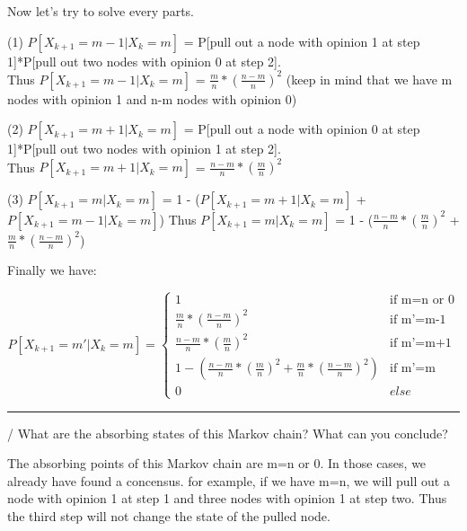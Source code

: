 \documentclass[11pt]{article}
\begin{document}
\vspace{5mm}

\noindent Now let's try to solve every parts.

(1) $P[X_{k+1} = m-1|X_{k} = m]$ = P[pull out a node with opinion 1 at step 1]*P[pull out two nodes with opinion 0 at step 2]. \\
Thus $P[X_{k+1} = m-1|X_{k} = m]$ = $\frac{m}{n}*(\frac{n-m}{n})^{2}$ (keep in mind that we have m nodes with opinion 1 and n-m nodes with opinion 0)

(2) $P[X_{k+1} = m+1|X_{k} = m]$ = P[pull out a node with opinion 0 at step 1]*P[pull out two nodes with opinion 1 at step 2]. \\
Thus $P[X_{k+1} = m+1|X_{k} = m]$ = $\frac{n-m}{n}*(\frac{m}{n})^{2}$

(3) $P[X_{k+1} = m|X_{k} = m]$ = 1 - ($P[X_{k+1} = m+1|X_{k} = m]$ + $P[X_{k+1} = m-1|X_{k} = m]$)
Thus $P[X_{k+1} = m|X_{k} = m]$ = 1 - ($\frac{n-m}{n}*(\frac{m}{n})^{2}$ + $\frac{m}{n}*(\frac{n-m}{n})^{2}$)

\vspace{5mm}

\noindent Finally we have: 

\begin{equation}
    P[X_{k+1} = m'|X_{k} = m]=
    \begin{cases}
        1 & \text{if m=n or 0}\\
        \frac{m}{n}*(\frac{n-m}{n})^{2} & \text{if m'=m-1}\\
        \frac{n-m}{n}*(\frac{m}{n})^{2} & \text{if m'=m+1}\\
        1 - (\frac{n-m}{n}*(\frac{m}{n})^{2} + \frac{m}{n}*(\frac{n-m}{n})^{2}) & \text{if m'=m}\\
        0 & else

    \end{cases}
\end{equation}


\begin{center}
    \noindent\rule{8cm}{0.4pt} 
\end{center}

\vspace{5mm}

/ What are the absorbing states of this Markov chain? What can you conclude?

\vspace{5mm}

\noindent The absorbing points of this Markov chain are m=n or 0. In those cases, we already have found a concensus. for example, if we have m=n, we will pull out a node with opinion 1 at step 1 and three nodes with opinion 1 at step two. Thus the third step will not change the state of the pulled node.
\end{document}
